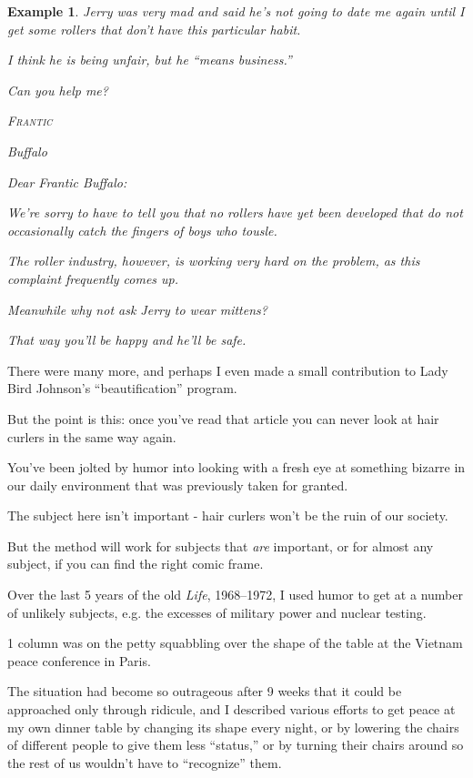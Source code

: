 \documentclass{book}
\numberwithin{equation}{section}
\newtheorem{example}{Example}[chapter]
\begin{document}
\begin{example}
    Jerry was very mad and said he's not going to date me again until I get some rollers that don't have this particular habit.
    
    I think he is being unfair, but he ``means business.''
    
    Can you help me?
    \begin{flushright}
        \textsc{Frantic}
        
        Buffalo
    \end{flushright}
    Dear Frantic Buffalo:
    
    We're sorry to have to tell you that no rollers have yet been developed that do not occasionally catch the fingers of boys who tousle.
    
    The roller industry, however, is working very hard on the problem, as this complaint frequently comes up.
    
    Meanwhile why not ask Jerry to wear mittens?
    
    That way you'll be happy and he'll be safe.
\end{example}
There were many more, and perhaps I even made a small contribution to Lady Bird Johnson's ``beautification'' program.

But the point is this: once you've read that article you can never look at hair curlers in the same way again.

You've been jolted by humor into looking with a fresh eye at something bizarre in our daily environment that was previously taken for granted.

The subject here isn't important - hair curlers won't be the ruin of our society.

But the method will work for subjects that \textit{are} important, or for almost any subject, if you can find the right comic frame.

Over the last 5 years of the old \textit{Life}, 1968--1972, I used humor to get at a number of unlikely subjects, e.g. the excesses of military power and nuclear testing.

1 column was on the petty squabbling over the shape of the table at the Vietnam peace conference in Paris.

The situation had become so outrageous after 9 weeks that it could be approached only through ridicule, and I described various efforts to get peace at my own dinner table by changing its shape every night, or by lowering the chairs of different people to give them less ``status,'' or by turning their chairs around so the rest of us wouldn't have to ``recognize'' them.
\end{document}
